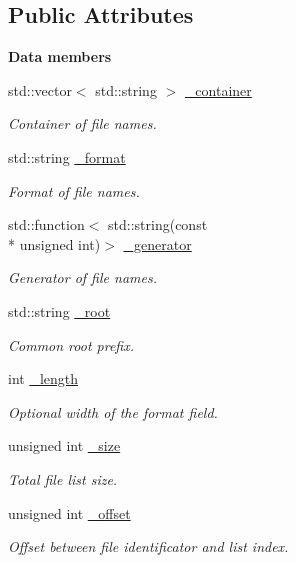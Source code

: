 \subsection*{Public Attributes}
\begin{Indent}{\bf Data members}\par
\begin{DoxyCompactItemize}
\item 
std\-::vector$<$ std\-::string $>$ \hyperlink{exceptionmagrathea_1_1FileList_aa43c55ce940c12b9f5930986a02d8eac}{\-\_\-container}
\begin{DoxyCompactList}\small\item\em Container of file names. \end{DoxyCompactList}\item 
std\-::string \hyperlink{exceptionmagrathea_1_1FileList_aee95bf2eba7d038aaa758cd95377718d}{\-\_\-format}
\begin{DoxyCompactList}\small\item\em Format of file names. \end{DoxyCompactList}\item 
std\-::function$<$ std\-::string(const \\*
unsigned int)$>$ \hyperlink{exceptionmagrathea_1_1FileList_ae48041c20b9fa235eabddb669d46e7ff}{\-\_\-generator}
\begin{DoxyCompactList}\small\item\em Generator of file names. \end{DoxyCompactList}\item 
std\-::string \hyperlink{exceptionmagrathea_1_1FileList_ade7181de1eb09d72b7f31dc23706543e}{\-\_\-root}
\begin{DoxyCompactList}\small\item\em Common root prefix. \end{DoxyCompactList}\item 
int \hyperlink{exceptionmagrathea_1_1FileList_a5cf636b1b4d2779dc42f19a55cef64b8}{\-\_\-length}
\begin{DoxyCompactList}\small\item\em Optional width of the format field. \end{DoxyCompactList}\item 
unsigned int \hyperlink{exceptionmagrathea_1_1FileList_a23c0c6219ba569c2851ac0c63557c4d0}{\-\_\-size}
\begin{DoxyCompactList}\small\item\em Total file list size. \end{DoxyCompactList}\item 
unsigned int \hyperlink{exceptionmagrathea_1_1FileList_a134bb92386ba0ca11879f66c534eecc1}{\-\_\-offset}
\begin{DoxyCompactList}\small\item\em Offset between file identificator and list index. \end{DoxyCompactList}\end{DoxyCompactItemize}
\end{Indent}
